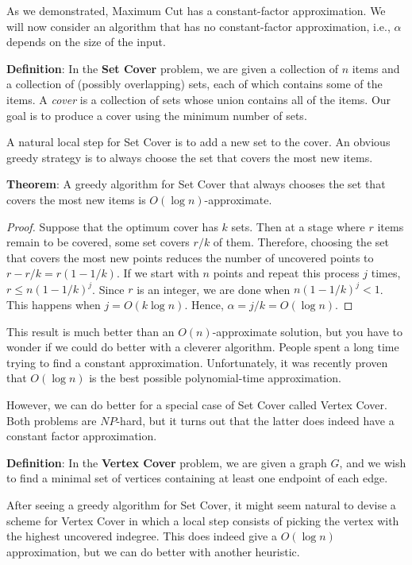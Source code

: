 \documentclass{article}
\begin{document}
As we demonstrated, Maximum Cut has a constant-factor approximation.
We will now consider an algorithm that has no constant-factor
approximation, i.e., $\alpha$ depends on the size of the input.

\textbf{Definition}:
In the \textbf{Set Cover} problem, we are given a collection of $n$ items
and a collection of (possibly overlapping) sets, each of which
contains some of the items.  A \textit{cover} is a collection of sets
whose union contains all of the items.  Our goal is to produce a
cover using the minimum number of sets.

A natural local step for Set Cover is to add a new set to the cover.
An obvious greedy strategy is to always choose the set that covers the
most new items.

\textbf{Theorem}:
A greedy algorithm for Set Cover that always chooses the set that
covers the most new items is $O(\log n)$-approximate.

\begin{proof}
Suppose that the optimum cover has $k$ sets.  Then at a stage where
$r$ items remain to be covered, some set covers $r/k$ of them.
Therefore, choosing the set that covers the most new points reduces
the number of uncovered points to $r-r/k = r(1-1/k)$.  If we start
with $n$ points and repeat this process $j$ times, $r\le n(1-1/k)^j$.
Since $r$ is an integer, we are done when $n(1-1/k)^j < 1$.  This
happens when $j = O(k\log n)$.  Hence, $\alpha = j/k = O(\log n)$.
\end{proof}

This result is much better than an $O(n)$-approximate solution, but
you have to wonder if we could do better with a cleverer algorithm.
People spent a long time trying to find a constant approximation.
Unfortunately, it was recently proven that $O(\log n)$ is the best
possible polynomial-time approximation.

However, we can do better for a special case of Set Cover called
Vertex Cover.  Both problems are $NP$-hard, but it turns out that the
latter does indeed have a constant factor approximation.

\textbf{Definition}:
In the \textbf{Vertex Cover} problem, we are given a graph $G$, and we
wish to find a minimal set of vertices containing at least one
endpoint of each edge.

After seeing a greedy algorithm for Set Cover, it might seem natural
to devise a scheme for Vertex Cover in which a local step consists of
picking the vertex with the highest uncovered indegree.  This does
indeed give a $O(\log n)$ approximation, but we can do better with
another heuristic.
\end{document}
